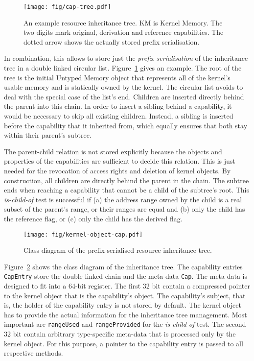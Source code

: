 \begin{figure}
  \centering
  \texttt{[image: fig/cap-tree.pdf]}
  \caption{An example resource inheritance tree. KM is Kernel Memory. The two digits mark original, derivation and reference capabilities. The dotted arrow shows the actually stored prefix serialisation.}
  \label{fig:cap-tree}
\end{figure}

In combination, this allows to store just the \emph{prefix serialisation} of the inheritance tree in a double linked circular list. Figure~\ref{fig:cap-tree} gives an example. The root of the tree is the initial Untyped Memory object that represents all of the kernel's usable memory and is statically owned by the kernel. The circular list avoids to deal with the special case of the list's end. Children are inserted directly behind the parent into this chain. In order to insert a sibling behind a capability, it would be necessary to skip all existing children. Instead, a sibling is inserted before the capability that it inherited from, which equally ensures that both stay within their parent's subtree.

The parent-child relation is not stored explicitly because the objects and properties of the capabilities are sufficient to decide this relation. This is just needed for the revocation of access rights and deletion of kernel objects. By construction, all children are directly behind the parent in the chain. The subtree ends when reaching a capability that cannot be a child of the subtree's root. This \emph{is-child-of} test is successful if (a) the address range owned by the child is a real subset of the parent's range, or their ranges are equal and (b) only the child has the reference flag, or (c) only the child has the derived flag.

\begin{figure}
  \centering
  \texttt{[image: fig/kernel-object-cap.pdf]}
  \caption{Class diagram of the prefix-serialised resource inheritance tree.}
  \label{fig:kernel-object-cap}
\end{figure}

Figure~\ref{fig:kernel-object-cap} shows the class diagram of the inheritance tree. The capability entries \texttt{CapEntry} store the double-linked chain and the meta data \texttt{Cap}. The meta data is designed to fit into a 64-bit register. The first 32 bit contain a compressed pointer to the kernel object that is the capability's object. The capability's subject, that is, the holder of the capability entry is not stored by default. The kernel object has to provide the actual information for the inheritance tree management. Most important are \texttt{rangeUsed} and \texttt{rangeProvided} for the \emph{is-child-of} test. The second 32 bit contain arbitrary type-specific meta-data that is processed only by the kernel object. For this purpose, a pointer to the capability entry is passed to all respective methods.

